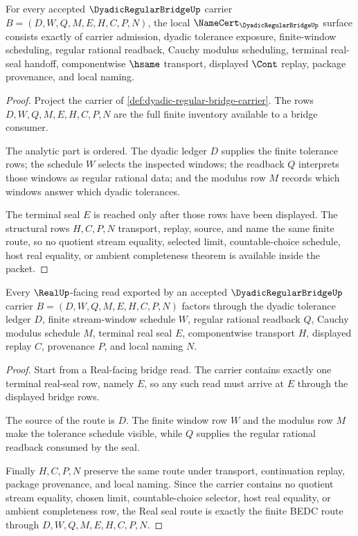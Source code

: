 \begin{theorem}
\label{thm:dyadic-regular-bridge-namecert-obligations}
For every accepted $\DyadicRegularBridgeUp$ carrier $B=(D,W,Q,M,E,H,C,P,N)$, the local $\NameCert_{\DyadicRegularBridgeUp}$ surface consists exactly of carrier admission, dyadic tolerance exposure, finite-window scheduling, regular rational readback, Cauchy modulus scheduling, terminal real-seal handoff, componentwise $\hsame$ transport, displayed $\Cont$ replay, package provenance, and local naming.
\end{theorem}
\begin{proof}
Project the carrier of \autoref{def:dyadic-regular-bridge-carrier}. The rows $D,W,Q,M,E,H,C,P,N$ are the full finite inventory available to a bridge consumer.

The analytic part is ordered. The dyadic ledger $D$ supplies the finite tolerance rows; the schedule $W$ selects the inspected windows; the readback $Q$ interprets those windows as regular rational data; and the modulus row $M$ records which windows answer which dyadic tolerances.

The terminal seal $E$ is reached only after those rows have been displayed. The structural rows $H,C,P,N$ transport, replay, source, and name the same finite route, so no quotient stream equality, selected limit, countable-choice schedule, host real equality, or ambient completeness theorem is available inside the packet.
\end{proof}

\begin{theorem}
\label{thm:dyadic-regular-bridge-real-seal-route}
Every $\RealUp$-facing read exported by an accepted $\DyadicRegularBridgeUp$ carrier $B=(D,W,Q,M,E,H,C,P,N)$ factors through the dyadic tolerance ledger $D$, finite stream-window schedule $W$, regular rational readback $Q$, Cauchy modulus schedule $M$, terminal real seal $E$, componentwise transport $H$, displayed replay $C$, provenance $P$, and local naming $N$.
\end{theorem}
\begin{proof}
Start from a Real-facing bridge read. The carrier contains exactly one terminal real-seal row, namely $E$, so any such read must arrive at $E$ through the displayed bridge rows.

The source of the route is $D$. The finite window row $W$ and the modulus row $M$ make the tolerance schedule visible, while $Q$ supplies the regular rational readback consumed by the seal.

Finally $H,C,P,N$ preserve the same route under transport, continuation replay, package provenance, and local naming. Since the carrier contains no quotient stream equality, chosen limit, countable-choice selector, host real equality, or ambient completeness row, the Real seal route is exactly the finite BEDC route through $D,W,Q,M,E,H,C,P,N$.
\end{proof}

